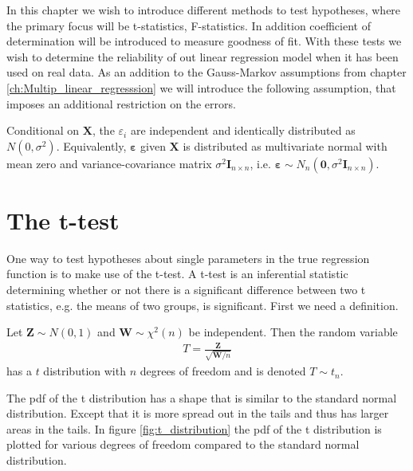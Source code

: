 In this chapter we wish to introduce different methods to test hypotheses, where the primary focus will be t-statistics, F-statistics. In addition coefficient of determination will be introduced to measure goodness of fit. 
With these tests we wish to determine the reliability of out linear regression model when it has been used on real data.
As an addition to the Gauss-Markov assumptions from chapter \ref{ch:Multip_linear_regresssion} we will introduce the following assumption, that imposes an additional restriction on the errors. 

\begin{assumption} \label{as:normality_of_errors}
    Conditional on $\mathbf{X}$, the $\varepsilon_i$ are independent and identically distributed as $N(0, \sigma^2)$. Equivalently, $\boldsymbol{\varepsilon}$ given $\mathbf{X}$ is distributed as multivariate normal with mean zero and variance-covariance matrix $\sigma^2 \mathbf{I}_{n \times n}$, i.e. $\boldsymbol{\varepsilon} \sim N_n(\mathbf{0}, \sigma^2 \mathbf{I}_{n \times n})$.
\end{assumption}

\section{The t-test}
One way to test hypotheses about single parameters in the true regression function is to make use of the t-test. 
A t-test is an inferential statistic determining whether or not there is a significant difference between two t statistics, e.g. the means of two groups, is significant. First we need a definition.

\begin{definition}[T-distribution]\label{def:t_distribution}
    Let $\textbf{Z} \sim N(0,1)$ and $\textbf{W} \sim \chi^2(n)$ be independent. Then the random variable
    \begin{align*}
       T = \frac{\textbf{Z}}{\sqrt{\textbf{W}/n}}
    \end{align*}
    has a $t$ distribution with $n$ degrees of freedom and is denoted $T \sim t_n$.
\end{definition}

The pdf of the t distribution has a shape that is similar to the standard normal distribution. Except that it is more spread out in the tails and thus has larger areas in the tails. In figure \ref{fig:t_distribution} the pdf of the t distribution is plotted for various degrees of freedom compared to the standard normal distribution. 

